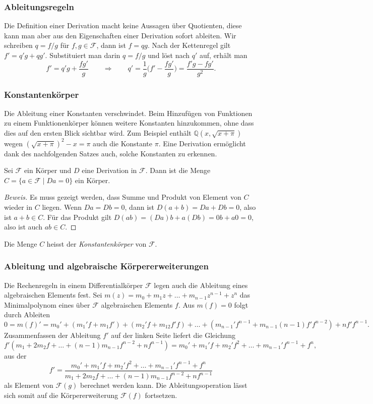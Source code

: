 %
%
\subsubsection{Ableitungsregeln}
Die Definition einer Derivation macht keine Aussagen über Quotienten,
diese kann man aber aus den Eigenschaften einer Derivation sofort
ableiten.
Wir schreiben $q=f/g$ für $f,g\in\mathscr{F}$, dann ist $f=qg$.
Nach der Kettenregel gilt
\(
f'=q'g+qg'
\).
Substituiert man darin $q=f/g$ und löst nach $q'$ auf, erhält man
\[
f'=q'g+\frac{fg'}{g}
\qquad\Rightarrow\qquad
q'=\frac1{g}\biggl(f'-\frac{fg'}{g}\biggr)
=
\frac{f'g-fg'}{g^2}.
\]


%
%
\subsubsection{Konstantenkörper}
Die Ableitung einer Konstanten verschwindet.
Beim Hinzufügen von Funktionen zu einem Funktionenkörper können weitere
Konstanten hinzukommen, ohne dass dies auf den ersten Blick sichtbar wird.
Zum Beispiel enthält $\mathbb{Q}(x,\!\sqrt{x+\pi})$ wegen
$(\!\sqrt{x+\pi})^2-x=\pi$ auch die Konstante $\pi$.
Eine Derivation ermöglicht dank des nachfolgenden Satzes auch,
solche Konstanten zu erkennen.

\begin{satz}
Sei $\mathscr{F}$ ein Körper und $D$ eine Derivation in $\mathscr{F}$.
Dann ist die Menge $C=\{a\in\mathscr{F}\;|\;Da=0\}$ ein Körper.
\end{satz}

\begin{proof}[Beweis]
Es muss gezeigt werden, dass Summe und Produkt von Element von $C$ 
wieder in $C$ liegen.
Wenn $Da=Db=0$, dann ist $D(a+b)=Da+Db=0$, also ist $a+b\in C$.
Für das Produkt gilt $D(ab)=(Da)b+a(Db)=0b+a0=0$, also ist auch
$ab\in C$.
\end{proof}

Die Menge $C$ heisst der {\em Konstantenkörper} von $\mathscr{F}$.
%

%
%
\subsubsection{Ableitung und algebraische Körpererweiterungen}
Die Rechenregeln in einem Differentialkörper $\mathscr{F}$ legen auch die
Ableitung eines algebraischen Elements fest.
Sei $m(z)=m_0+m_1z+\ldots+m_{n-1}z^{n-1}+z^n$ das Minimalpolynom eines
über $\mathscr{F}$ algebraischen Elements $f$.
Aus $m(f)=0$ folgt durch Ableiten
\[
0
=
m(f)'
=
m_0'
+
(m_1'f+m_1f')
+
(m_2'f + m_12f'f)
+
\ldots
+
(m_{n-1}'f^{n-1} + m_{n-1} (n-1)f'f^{n-2})
+
nf'f^{n-1}.
\]
Zusammenfassen der Ableitung $f'$ auf der linken Seite liefert die
Gleichung
\[
f'(
m_1+2m_2f+\ldots+(n-1)m_{n-1}f^{n-2}+nf^{n-1}
)
=
m_0' + m_1'f + m_2'f^2 + \ldots + m_{n-1}'f^{n-1} + f^n,
\]
aus der
\[
f'
=
\frac{
m_0' + m_1'f + m_2'f^2 + \ldots + m_{n-1}'f^{n-1} + f^n
}{
m_1+2m_2f+\ldots+(n-1)m_{n-1}f^{n-2}+nf^{n-1}
}
\]
als Element von $\mathscr{F}(g)$ berechnet werden kann.
Die Ableitungsoperation lässt sich somit auf die Körpererweiterung
$\mathscr{F}(f)$ fortsetzen.

